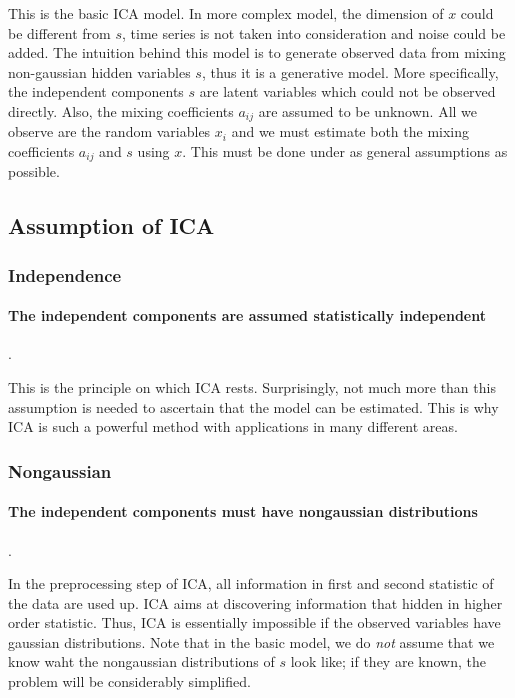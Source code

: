 \documentclass[a4paper]{book}
\begin{document}
    This is the basic ICA model. In more complex model, the dimension of
    $x$ could be different from $s$, time series is not taken into
    consideration and noise could be added. The intuition behind this
    model is to generate observed data from mixing non-gaussian hidden
    variables $s$, thus it is a generative model.  More specifically,
    the independent components $s$ are latent variables which could not
    be observed directly. Also, the mixing coefficients $a_{ij}$ are
    assumed to be unknown. All we observe are the random variables
    $x_{i}$ and we must estimate both the mixing coefficients $a_{ij}$
    and $s$ using $x$. This must be done under as general assumptions as
    possible.

    \subsection{Assumption of ICA}

      \subsubsection{Independence}

      \paragraph{The independent components are assumed statistically
        independent}.

      This is the principle on which ICA rests. Surprisingly, not much
      more than this assumption is needed to ascertain that the model
      can be estimated. This is why ICA is such a powerful method with
      applications in many different areas.

      \subsubsection{Nongaussian}

      \paragraph{The independent components must have nongaussian
        distributions}.

      In the preprocessing step of ICA, all information in first and
      second statistic of the data are used up. ICA aims at discovering
      information that hidden in higher order statistic. Thus, ICA is
      essentially impossible if the observed variables have gaussian
      distributions. Note that in the basic model, we do \textit{not}
      assume that we know waht the nongaussian distributions of $s$ look
      like; if they are known, the problem will be considerably
      simplified.
\end{document}
